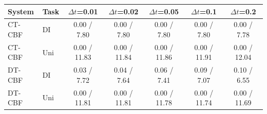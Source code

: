 \begin{tabular}{llccccc}
\hline
System & Task & $\Delta t$=0.01 & $\Delta t$=0.02 & $\Delta t$=0.05 & $\Delta t$=0.1 & $\Delta t$=0.2 \\
\hline
CT-CBF & DI & 0.00 / 7.80 & 0.00 / 7.80 & 0.00 / 7.80 & 0.00 / 7.80 & 0.00 / 7.78 \\
CT-CBF & Uni & 0.00 / 11.83 & 0.00 / 11.84 & 0.00 / 11.86 & 0.00 / 11.91 & 0.00 / 12.04 \\
DT-CBF & DI & 0.03 / 7.72 & 0.04 / 7.64 & 0.06 / 7.41 & 0.09 / 7.07 & 0.10 / 6.55 \\
DT-CBF & Uni & 0.00 / 11.81 & 0.00 / 11.81 & 0.00 / 11.78 & 0.00 / 11.74 & 0.00 / 11.69 \\
\hline
\end{tabular}
